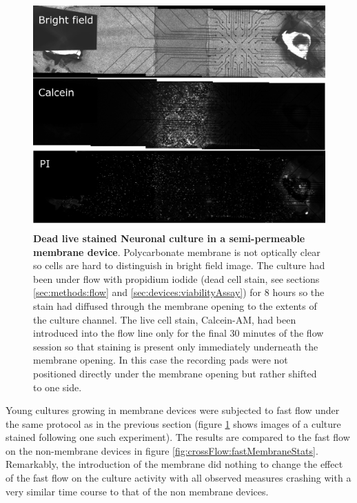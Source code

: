         \begin{figure}[!htb]
            \centering
            \includegraphics[width=15cm]{chapter5/figures/shiftedMembraneImage/shiftedMembrane.jpg}
            \caption[Bright field and staining images of a culture in a cross flow device inclusive of a semi-permeable membrane]{\textbf{Dead live stained Neuronal culture in a semi-permeable membrane device}. Polycarbonate membrane is not optically clear so cells are hard to distinguish in bright field image. The culture had been under flow with propidium iodide (dead cell stain, see sections \ref{sec:methods:flow} and \ref{sec:devices:viabilityAssay}) for 8 hours so the stain had diffused through the membrane opening to the extents of the culture channel. The live cell stain, Calcein-AM, had been introduced into the flow line only for the final 30 minutes of the flow session so that staining is present only immediately underneath the membrane opening. In this case the recording pads were not positioned directly under the membrane opening but rather shifted to one side.}
            \label{fig:crossFlow:shiftedMembrane}
        \end{figure}

        Young cultures growing in membrane devices were subjected to fast flow under the same protocol as in the previous section (figure \ref{fig:crossFlow:shiftedMembrane} shows images of a culture stained following one such experiment). The results are compared to the fast flow on the non-membrane devices in figure \ref{fig:crossFlow:fastMembraneStats}. Remarkably, the introduction of the membrane did nothing to change the effect of the fast flow on the culture activity with all observed measures crashing with a very similar time course to that of the non membrane devices.

